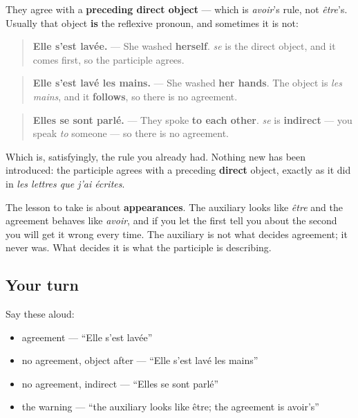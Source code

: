 \begin{grammarlens}[title={Grammar Lens: être on the outside, avoir underneath}]
They agree with a \textbf{preceding direct object} — which is \emph{avoir}'s rule, not \emph{être}'s. Usually that object \textbf{is} the reflexive pronoun, and sometimes it is not:

\begin{quote}
\textbf{Elle s'est lavée.} — She washed \textbf{herself}. \emph{se} is the direct object, and it comes first, so the participle agrees.
\end{quote}

\begin{quote}
\textbf{Elle s'est lavé les mains.} — She washed \textbf{her hands}. The object is \emph{les mains}, and it \textbf{follows}, so there is no agreement.
\end{quote}

\begin{quote}
\textbf{Elles se sont parlé.} — They spoke \textbf{to each other}. \emph{se} is \textbf{indirect} — you speak \emph{to} someone — so there is no agreement.
\end{quote}

Which is, satisfyingly, the rule you already had. Nothing new has been introduced: the participle agrees with a preceding \textbf{direct} object, exactly as it did in \emph{les lettres que j'ai écrites}.

The lesson to take is about \textbf{appearances}. The auxiliary looks like \emph{être} and the agreement behaves like \emph{avoir}, and if you let the first tell you about the second you will get it wrong every time. The auxiliary is not what decides agreement; it never was. What decides it is what the participle is describing.
\end{grammarlens}

\subsection*{Your turn}
Say these aloud:

\begin{itemize}
\raggedright
  \item agreement — \textquotedblleft{}Elle s'est lavée\textquotedblright{}
  \item no agreement, object after — \textquotedblleft{}Elle s'est lavé les mains\textquotedblright{}
  \item no agreement, indirect — \textquotedblleft{}Elles se sont parlé\textquotedblright{}
  \item the warning — \textquotedblleft{}the auxiliary looks like être; the agreement is avoir's\textquotedblright{}
\end{itemize}

